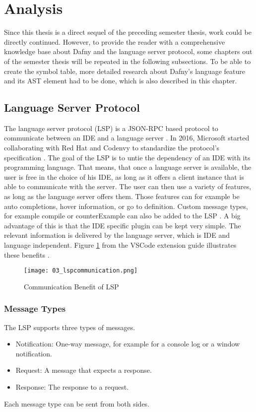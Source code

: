 \section{Analysis}
\label{section:analysis}
Since this thesis is a direct sequel of the preceding semester thesis, work could be directly continued.
However, to provide the reader with a comprehensive knowledge base about Dafny and the language server protocol, some chapters out of the semester thesis will be repeated in the following subsections.
To be able to create the symbol table, more detailed research about Dafny's language feature and its AST element had to be done, which is also described in this chapter.

\subsection{Language Server Protocol}
\label{section:analysis:lsp}
The language server protocol (LSP) is a JSON-RPC based protocol to communicate between an IDE and a language server \cite{dafnyWiki}.
In 2016, Microsoft started collaborating with Red Hat and Codenvy to standardize the protocol’s specification \cite{dafnyWiki}.
The goal of the LSP is to untie the dependency of an IDE with its programming language.
That means, that once a language server is available, the user is free in the choice of his IDE, as long as it offers a client instance that is able to communicate with the server.
The user can then use a variety of features, as long as the language server offers them.
Those features can for example be auto completions, hover information, or go to definition.
Custom message types, for example compile or counterExample can also be added to the LSP \cite{dafnyWiki}.
A big advantage of this is that the IDE specific plugin can be kept very simple.
The relevant information is delivered by the language server, which is IDE and language independent.
Figure \ref{fig:lspcommunication} from the VSCode extension guide illustrates these benefits \cite{lspextensionguide}.

\begin{figure}[h]
    \centering
    \texttt{[image: 03\_lspcommunication.png]}
    \caption{Communication Benefit of LSP}
    \label{fig:lspcommunication}
\end{figure}

\subsubsection{Message Types}
The LSP supports three types of messages.
\begin{itemize}
    \item Notification: One-way message, for example for a console log or a window notification.
    \item Request: A message that expects a response.
    \item Response: The response to a request.
\end{itemize}
Each message type can be sent from both sides.

